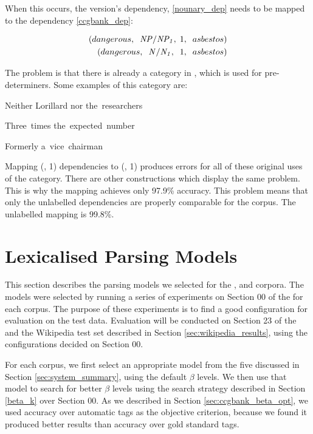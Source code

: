 When this occurs, the \nounary version's dependency, \ref{nounary_dep} needs to
be mapped to the \ccgbank dependency \ref{ccgbank_dep}:

\begin{eqnarray}
(dangerous,\;\; \cf{NP/NP_1},\; 1,\;\; asbestos)\label{nounary_dep}\\
(dangerous,\;\; \cf{N/N_1},\;\; 1,\;\; asbestos)\label{ccgbank_dep}
\end{eqnarray}

The problem is that there is already a  category in \ccgbank, which is
used for pre-determiners. Some examples of this category are:

\begin{lexamples}
 \item \gll Neither Lorillard   nor     the~researchers
              
\gln
\glend
 \item \gll Three~times the~expected~number
              
\gln
\glend
 \item \gll Formerly a~vice~chairman
           
\gln
\glend
\end{lexamples}

Mapping (, 1) dependencies to (, 1) produces errors for
all of these original uses of the category. There are other constructions which
display the same problem. This is why the mapping achieves only 97.9\% accuracy.
This problem means that only the unlabelled dependencies are properly comparable
for the \nounary corpus. The unlabelled mapping is 99.8\%.

\section{Lexicalised Parsing Models}

This section describes the parsing models we selected for the \hatsys, \nounary
and \trsys corpora. The models were selected by running a series of experiments
on Section 00 of the \wsj for each corpus. The purpose of these experiments is
to find a good configuration for evaluation on the test data. Evaluation will be
conducted on Section 23 of the \wsj and the \wikieval Wikipedia test set
described in Section \ref{sec:wikipedia_results}, using the configurations
decided on Section 00.

For each corpus, we first select an appropriate model from the five discussed in
Section \ref{sec:system_summary}, using the default $\beta$ levels. We then use
that model to search for better $\beta$ levels using the search strategy
described in Section \ref{beta_k} over Section 00. As we described in Section
\ref{sec:ccgbank_beta_opt}, we used accuracy over automatic \pos tags as the
objective criterion, because we found it produced better results than accuracy
over gold standard \pos tags.




